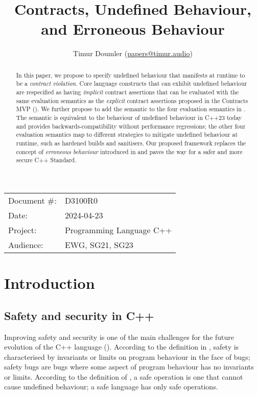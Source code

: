 

 \usepackage[bottom]{footmisc} 


\title{Contracts, Undefined Behaviour, and Erroneous Behaviour}
\author{ Timur Doumler \small(\href{mailto:papers@timur.audio}{papers@timur.audio})  
}
\date{}
\maketitle

\begin{tabular}{ll}
Document \#: & D3100R0 \\
Date: &2024-04-23 \\
Project: & Programming Language C++ \\
Audience: & EWG, SG21, SG23
\end{tabular}

\begin{abstract}
In this paper, we propose to specify undefined behaviour that manifests at runtime to be a \emph{contract violation}. Core language constructs that can exhibit undefined behaviour are respecified as having \emph{implicit} contract assertions that can be evaluated with the same evaluation semantics as the \emph{explicit} contract assertions proposed in the Contracts MVP (\cite{P2900R6}). We further propose to add the  semantic to the four evaluation semantics in \cite{P2900R6}. The  semantic is equivalent to the behaviour of undefined behaviour in C++23 today and provides backwards-compatibility without performance regressions; the other four evaluation semantics map to different strategies to mitigate undefined behaviour at runtime, such as hardened builds and sanitisers. Our proposed framework replaces the concept of \emph{erroneous behaviour} introduced in \cite{P2795R5} and paves the way for a safer and more secure C++ Standard.
\end{abstract}

\section{Introduction}
\label{sec:intro}

\subsection{Safety and security in C++}


Improving safety and security is one of the main challenges for the future evolution of the C++ language (\cite{Bastien2023}). According to the definition in \cite{Carruth2023}, safety is characterised by invariants or limits on program behaviour in the face of bugs; safety bugs are bugs where some aspect of program behaviour has no invariants or limits. According to the definition of \cite{Abrahams2023}, a safe operation is one that cannot cause undefined behaviour; a safe language has only safe operations. 


